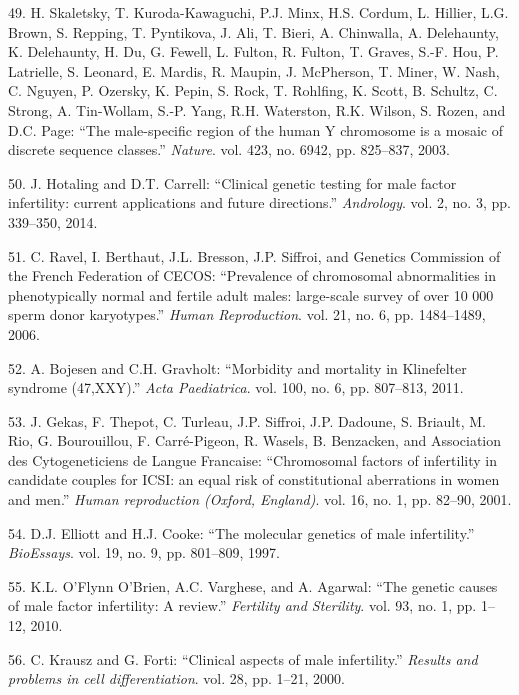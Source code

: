 \documentclass[12pt,twoside]{ugathesis}
\theoremstyle{definition}
\theoremstyle{definition}
\theoremstyle{remark}
\begin{document}
\hypertarget{ref-Skaletsky2003}{}
49. H. Skaletsky, T. Kuroda-Kawaguchi, P.J. Minx, H.S. Cordum, L.
Hillier, L.G. Brown, S. Repping, T. Pyntikova, J. Ali, T. Bieri, A.
Chinwalla, A. Delehaunty, K. Delehaunty, H. Du, G. Fewell, L. Fulton, R.
Fulton, T. Graves, S.-F. Hou, P. Latrielle, S. Leonard, E. Mardis, R.
Maupin, J. McPherson, T. Miner, W. Nash, C. Nguyen, P. Ozersky, K.
Pepin, S. Rock, T. Rohlfing, K. Scott, B. Schultz, C. Strong, A.
Tin-Wollam, S.-P. Yang, R.H. Waterston, R.K. Wilson, S. Rozen, and D.C.
Page: ``The male-specific region of the human Y chromosome is a mosaic
of discrete sequence classes.'' \emph{Nature}. vol. 423, no. 6942, pp.
825--837, 2003.

\hypertarget{ref-Hotaling2014}{}
50. J. Hotaling and D.T. Carrell: ``Clinical genetic testing for male
factor infertility: current applications and future directions.''
\emph{Andrology}. vol. 2, no. 3, pp. 339--350, 2014.

\hypertarget{ref-Ravel2006}{}
51. C. Ravel, I. Berthaut, J.L. Bresson, J.P. Siffroi, and Genetics
Commission of the French Federation of CECOS: ``Prevalence of
chromosomal abnormalities in phenotypically normal and fertile adult
males: large-scale survey of over 10 000 sperm donor karyotypes.''
\emph{Human Reproduction}. vol. 21, no. 6, pp. 1484--1489, 2006.

\hypertarget{ref-Bojesen2011}{}
52. A. Bojesen and C.H. Gravholt: ``Morbidity and mortality in
Klinefelter syndrome (47,XXY).'' \emph{Acta Paediatrica}. vol. 100, no.
6, pp. 807--813, 2011.

\hypertarget{ref-Gekas2001}{}
53. J. Gekas, F. Thepot, C. Turleau, J.P. Siffroi, J.P. Dadoune, S.
Briault, M. Rio, G. Bourouillou, F. Carré-Pigeon, R. Wasels, B.
Benzacken, and Association des Cytogeneticiens de Langue Francaise:
``Chromosomal factors of infertility in candidate couples for ICSI: an
equal risk of constitutional aberrations in women and men.'' \emph{Human
reproduction (Oxford, England)}. vol. 16, no. 1, pp. 82--90, 2001.

\hypertarget{ref-Elliott1997}{}
54. D.J. Elliott and H.J. Cooke: ``The molecular genetics of male
infertility.'' \emph{BioEssays}. vol. 19, no. 9, pp. 801--809, 1997.

\hypertarget{ref-OFlynnOBrien2010}{}
55. K.L. O'Flynn O'Brien, A.C. Varghese, and A. Agarwal: ``The genetic
causes of male factor infertility: A review.'' \emph{Fertility and
Sterility}. vol. 93, no. 1, pp. 1--12, 2010.

\hypertarget{ref-Krausz2000}{}
56. C. Krausz and G. Forti: ``Clinical aspects of male infertility.''
\emph{Results and problems in cell differentiation}. vol. 28, pp. 1--21,
2000.
\end{document}
